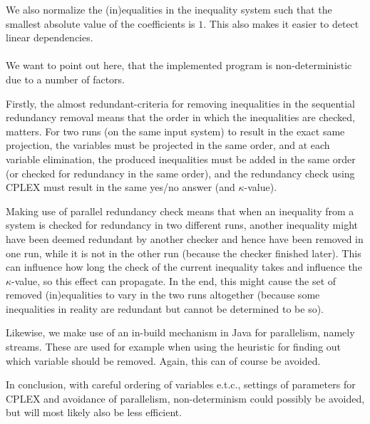 We also normalize the (in)equalities in the inequality system such that the smallest absolute value of the coefficients is $1$. This also makes it easier to detect linear dependencies. 
\\
\\
We want to point out here, that the implemented program is non-deterministic due to a number of factors. 

Firstly, the almost redundant-criteria for removing inequalities in the sequential redundancy removal means that the order in which the inequalities are checked, matters. 
For two runs (on the same input system) to result in the exact  same projection, the variables must be projected in the same order, and at each variable elimination, the produced inequalities must be added in the same order (or checked for redundancy in the same order), and the redundancy check using CPLEX must result in the same yes/no answer (and $\kappa$-value). %
 
Making use of parallel redundancy check means that when an inequality from a system is checked for redundancy in two different runs, another inequality might have been deemed redundant by another checker and hence have been removed in one run, while it is not in the other run (because the checker finished later). This can influence how long the check of the current inequality takes and influence the $\kappa$-value, so this effect can propagate. In the end, this might cause the set of removed (in)equalities to vary in the two runs altogether (because some inequalities in reality are redundant but cannot be determined to be so). 

Likewise, we make use of an in-build mechanism in Java for parallelism, namely streams. These are used for example when using the heuristic for finding out which variable should be removed. Again, this can of course be avoided.

In conclusion, with careful ordering of variables e.t.c., settings of parameters for CPLEX and avoidance of parallelism, non-determinism could possibly be avoided, but will most likely also be less efficient.  


%